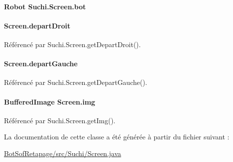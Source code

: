 \paragraph[{bot}]{\setlength{\rightskip}{0pt plus 5cm}Robot Suchi.\+Screen.\+bot\hspace{0.3cm}{\ttfamily [private]}}\label{classSuchi_1_1Screen_ae94bb10b21ceed85870f8c61e4bfba67}
\hypertarget{classSuchi_1_1Screen_a15ba39ba4dc1d80542d618a7345ffb0c}{}
\paragraph[{depart\+Droit}]{ Screen.\+depart\+Droit\hspace{0.3cm}{\ttfamily [private]}}\label{classSuchi_1_1Screen_a15ba39ba4dc1d80542d618a7345ffb0c}


Référencé par Suchi.\+Screen.\+get\+Depart\+Droit().

\hypertarget{classSuchi_1_1Screen_a347452258d6b2654d0366e6d97aa99fe}{}
\paragraph[{depart\+Gauche}]{ Screen.\+depart\+Gauche\hspace{0.3cm}{\ttfamily [private]}}\label{classSuchi_1_1Screen_a347452258d6b2654d0366e6d97aa99fe}


Référencé par Suchi.\+Screen.\+get\+Depart\+Gauche().

\hypertarget{classSuchi_1_1Screen_a2d5611bc884926482cd2364e5ae43f74}{}
\paragraph[{img}]{\setlength{\rightskip}{0pt plus 5cm}Buffered\+Image Screen.\+img\hspace{0.3cm}{\ttfamily [private]}}\label{classSuchi_1_1Screen_a2d5611bc884926482cd2364e5ae43f74}


Référencé par Suchi.\+Screen.\+get\+Img().



La documentation de cette classe a été générée à partir du fichier suivant \+:\begin{DoxyCompactItemize}
\item 
\hyperlink{BotSofRetapage_2src_2Suchi_2Screen_8java}{Bot\+Sof\+Retapage/src/\+Suchi/\+Screen.\+java}\end{DoxyCompactItemize}
